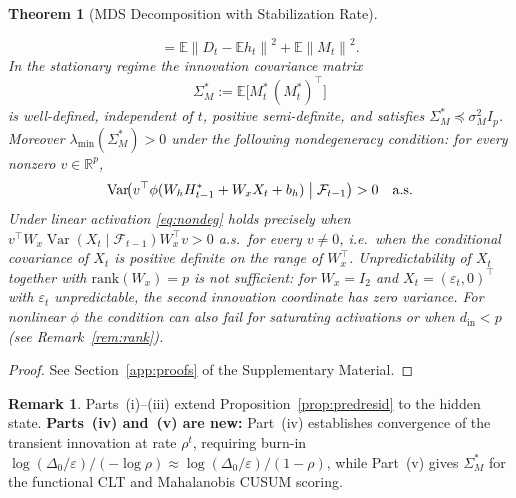 \documentclass[bj,authoryear]{imsart}
\theoremstyle{plain}
\newtheorem{theorem}{Theorem}[section]
\theoremstyle{definition}
\newtheorem{remark}{Remark}[section]
\newcommand{\E}{\mathbb{E}}
\newcommand{\R}{\mathbb{R}}
\newcommand{\F}{\mathcal{F}}
\newcommand{\norm}[1]{\left\lVert #1 \right\rVert}
\newcommand{\given}{\mid}
\DeclareMathOperator{\Var}{Var}
\begin{document}
\begin{theorem}[MDS Decomposition with Stabilization Rate]
\begin{enumerate}[label=(\roman*), itemsep=3pt]
\begin{equation}
        = \E\norm{D_t-\E h_t}^2 + \E\norm{M_t}^2.
        \label{eq:var-decomp}
      \end{equation}
      In the stationary regime the innovation covariance matrix
      \begin{equation}
        \Sigma_M^* := \E\bigl[M_t^*\,(M_t^*)^\top\bigr]
        \label{eq:SigmaM}
      \end{equation}
      is well-defined, independent of $t$, positive semi-definite,
      and satisfies $\Sigma_M^* \preceq \sigma_M^2 I_p$.
      Moreover $\lambda_{\min}(\Sigma_M^*)>0$ under the following
      nondegeneracy condition: for every nonzero $v\in\R^p$,
      \begin{equation}
        \Var\!\bigl(v^\top\phi(W_hH_{t-1}^*+W_xX_t+b_h)
          \bigm|\F_{t-1}\bigr) > 0
        \quad \text{a.s.}
        \label{eq:nondeg}
      \end{equation}
      Under linear activation \eqref{eq:nondeg} holds precisely when
      $v^\top W_x\Var(X_t\given\F_{t-1})W_x^\top v>0$ a.s.\ for every $v\neq0$,
      i.e.\ when the conditional covariance of $X_t$ is positive definite on the
      range of $W_x^\top$.  Unpredictability of $X_t$ together with
      $\mathrm{rank}(W_x)=p$ is \emph{not} sufficient: for $W_x=I_2$ and
      $X_t=(\varepsilon_t,0)^\top$ with $\varepsilon_t$ unpredictable, the second
      innovation coordinate has zero variance.  For nonlinear $\phi$ the
      condition can also fail for saturating activations or when
      $d_{\mathrm{in}}<p$ (see Remark~\ref{rem:rank}).
  \end{enumerate}
\end{theorem}

\begin{proof}
  See Section~\ref{app:proofs} of the Supplementary Material.
\end{proof}

\begin{remark}
Parts~(i)--(iii) extend Proposition~\ref{prop:predresid} to the hidden
state. \textbf{Parts~(iv) and~(v) are new:} Part~(iv) establishes
convergence of the transient innovation at rate $\rho^t$, requiring
burn-in
$\log(\Delta_0/\varepsilon)/(-\log\rho)\approx
\log(\Delta_0/\varepsilon)/(1-\rho)$,
while Part~(v) gives $\Sigma_M^*$ for the functional CLT and
Mahalanobis CUSUM scoring.
\end{remark}
\end{document}

